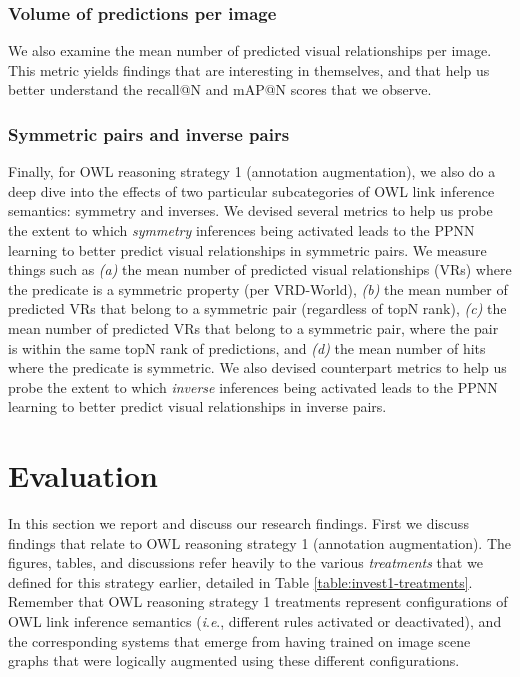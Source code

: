 \documentclass[]{jair}
\newcommand{\ie}{\textit{i}.\textit{e}.,\xspace}
\begin{document}
\subsubsection{Volume of predictions per image}
We also examine the mean number of predicted visual relationships per image.
This metric yields findings that are interesting in themselves, and that help us better understand the recall@N and mAP@N scores that we observe.

\subsubsection{Symmetric pairs and inverse pairs}
Finally, for OWL reasoning strategy 1 (annotation augmentation), we also do a deep dive into the effects of two particular subcategories of OWL link inference semantics: symmetry and inverses.
We devised several metrics to help us probe the extent to which \emph{symmetry} inferences being activated leads to the PPNN learning to better predict visual relationships in symmetric pairs.
We measure things such as \textit{(a)} the mean number of predicted visual relationships (VRs) where the predicate is a symmetric property (per VRD-World), \textit{(b)} the mean number of predicted VRs that belong to a symmetric pair (regardless of topN rank), \textit{(c)} the mean number of predicted VRs that belong to a symmetric pair, where the pair is within the same topN rank of predictions, and \textit{(d)} the mean number of hits where the predicate is symmetric.
We also devised counterpart metrics to help us probe the extent to which \emph{inverse} inferences being activated leads to the PPNN learning to better predict visual relationships in inverse pairs.






\section{Evaluation}
\label{sec:evaluation}

In this section we report and discuss our research findings.
First we discuss findings that relate to OWL reasoning strategy 1 (annotation augmentation).
The figures, tables, and discussions refer heavily to the various \emph{treatments} that we defined for this strategy earlier, detailed in Table \ref{table:invest1-treatments}. 
Remember that OWL reasoning strategy 1 treatments represent configurations of OWL link inference semantics (\ie different rules activated or deactivated), and the corresponding systems that emerge from having trained on image scene graphs that were logically augmented using these different configurations.
\end{document}
